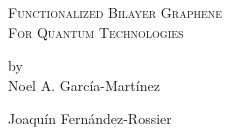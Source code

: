 \begin{titlepage}

\begin{center}

\begingroup \linespread{1,75} \selectfont
\textsc{{\LARGE
      Functionalized Bilayer Graphene\\
      For Quantum Technologies}}\\[1,5cm]
\endgroup


by\\[0,5cm]
Noel A. García-Martínez\\[2,5cm]


\end{center}

Joaquín Fernández-Rossier

\vfill

\end{titlepage}
